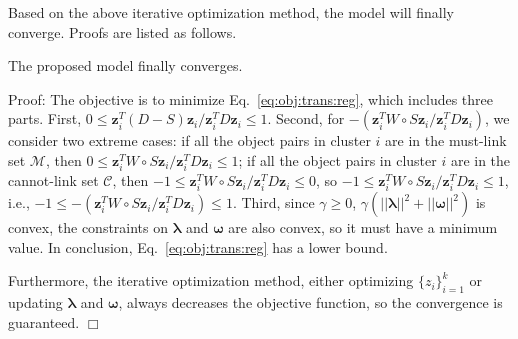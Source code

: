 {Based on the above iterative optimization method, the model will finally converge.
Proofs are listed as follows.
\begin{theorem}
\label{theorem3}
The proposed model finally converges.

Proof: The objective is to minimize Eq.~\ref{eq:obj:trans:reg}, which includes three parts.
First, $0 \leq \bm{z}_i^T(D-S)\bm{z}_i / \bm{z}_i^TD\bm{z}_i \leq 1$.
Second, for $-(\bm{z}_i^TW\circ S\bm{z}_i / \bm{z}_i^TD\bm{z}_i)$, we consider two extreme cases:
if all the object pairs in cluster $i$ are in the must-link set $\mathcal{M}$, then $0 \leq \bm{z}_i^TW\circ S\bm{z}_i / \bm{z}_i^TD\bm{z}_i \leq 1$;
if all the object pairs in cluster $i$ are in the cannot-link set $\mathcal{C}$, then $-1 \leq \bm{z}_i^TW\circ S\bm{z}_i / \bm{z}_i^TD\bm{z}_i \leq 0$,
so $-1 \leq \bm{z}_i^TW\circ S\bm{z}_i / \bm{z}_i^TD\bm{z}_i \leq 1$, i.e., $-1 \leq -(\bm{z}_i^TW\circ S\bm{z}_i / \bm{z}_i^TD\bm{z}_i) \leq 1$.
Third, since $\gamma \geq 0$, $\gamma (||\bm \lambda||^2 + ||\bm \omega||^2)$ is convex, the constraints on $\bm \lambda$ and $\bm \omega$ are 
also convex, so  
it must have a minimum value.
In conclusion, Eq.~\ref{eq:obj:trans:reg} has a lower bound.

Furthermore, the iterative optimization method, either optimizing $\{${\boldmath $z$}$_i\}_{i=1}^k$ or 
updating $\bm \lambda$ and $\bm \omega$, always decreases the objective function, so the convergence is guaranteed.
\hfill$\Box$
\end{theorem}

}








